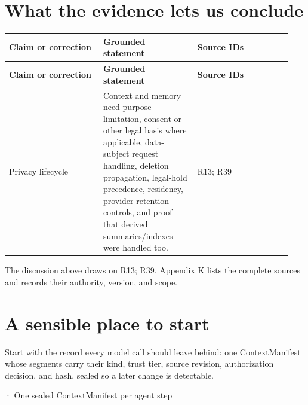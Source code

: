 \section{What the evidence lets us conclude}

\BookTableStart
\small
\begin{longtable}{@{}Y{0.3133\linewidth}Y{0.3133\linewidth}Y{0.3133\linewidth}@{}}
\color{white}\bfseries \textbf{Claim or correction} & \color{white}\bfseries \textbf{Grounded statement} & \color{white}\bfseries \textbf{Source IDs} \\
\endfirsthead
{}
\color{white}\bfseries \textbf{Claim or correction} & \color{white}\bfseries \textbf{Grounded statement} & \color{white}\bfseries \textbf{Source IDs} \\
\endhead
Privacy lifecycle & Context and memory need purpose limitation, consent or other legal basis where applicable, data-subject request handling, deletion propagation, legal-hold precedence, residency, provider retention controls, and proof that derived summaries/indexes were handled too. & R13; R39 \\
\end{longtable}
\BookTableEnd

The discussion above draws on R13; R39. Appendix K lists the complete sources and records their authority, version, and scope.\par

\section{A sensible place to start}

Start with the record every model call should leave behind: one ContextManifest whose segments carry their kind, trust tier, source revision, authorization decision, and hash, sealed so a later change is detectable.\par

\BookSnake · One sealed ContextManifest per agent step\par

